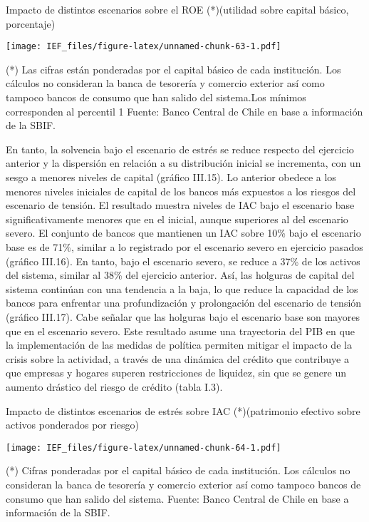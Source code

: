 \documentclass[
]{book}
\begin{document}
Impacto de distintos escenarios sobre el ROE (*)(utilidad sobre capital básico, porcentaje)

\texttt{[image: IEF\_files/figure-latex/unnamed-chunk-63-1.pdf]}

(*) Las cifras están ponderadas por el capital básico de cada institución. Los cálculos no consideran la banca de tesorería y comercio exterior así como tampoco bancos de consumo que han salido del sistema.Los mínimos corresponden al percentil 1
Fuente: Banco Central de Chile en base a información de la SBIF.

En tanto, la solvencia bajo el escenario de estrés se reduce respecto del ejercicio
anterior y la dispersión en relación a su distribución inicial se incrementa, con
un sesgo a menores niveles de capital (gráfico III.15). Lo anterior obedece a los
menores niveles iniciales de capital de los bancos más expuestos a los riesgos del
escenario de tensión. El resultado muestra niveles de IAC bajo el escenario base
significativamente menores que en el inicial, aunque superiores al del escenario
severo. El conjunto de bancos que mantienen un IAC sobre 10\% bajo el escenario
base es de 71\%, similar a lo registrado por el escenario severo en ejercicio pasados
(gráfico III.16). En tanto, bajo el escenario severo, se reduce a 37\% de los activos
del sistema, similar al 38\% del ejercicio anterior. Así, las holguras de capital del
sistema continúan con una tendencia a la baja, lo que reduce la capacidad de
los bancos para enfrentar una profundización y prolongación del escenario de
tensión (gráfico III.17). Cabe señalar que las holguras bajo el escenario base son
mayores que en el escenario severo. Este resultado asume una trayectoria del PIB
en que la implementación de las medidas de política permiten mitigar el impacto
de la crisis sobre la actividad, a través de una dinámica del crédito que contribuye
a que empresas y hogares superen restricciones de liquidez, sin que se genere un
aumento drástico del riesgo de crédito (tabla I.3).

Impacto de distintos escenarios de estrés sobre IAC (*)(patrimonio efectivo sobre activos ponderados por riesgo)

\texttt{[image: IEF\_files/figure-latex/unnamed-chunk-64-1.pdf]}

(*) Cifras ponderadas por el capital básico de cada institución. Los cálculos no consideran la banca de tesorería y comercio exterior así como tampoco bancos de consumo que han salido del sistema.
Fuente: Banco Central de Chile en base a información de la SBIF.
\end{document}
